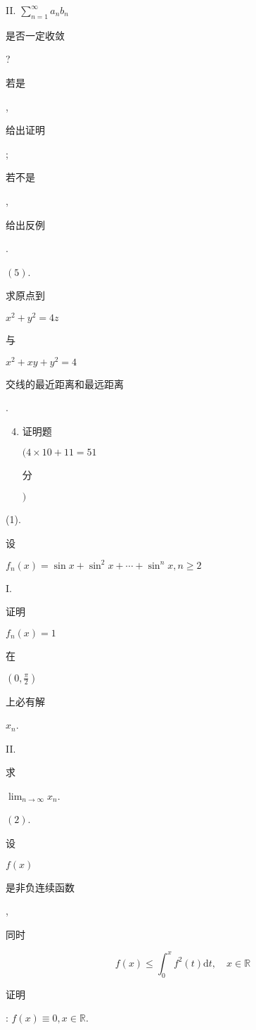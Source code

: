 \documentclass[10pt]{article}
\begin{document}
II. $\sum_{n=1}^{\infty} a_{n} b_{n}$ \begin{CJK}{UTF8}{mj}是否一定收敛\end{CJK}? \begin{CJK}{UTF8}{mj}若是\end{CJK}, \begin{CJK}{UTF8}{mj}给出证明\end{CJK}; \begin{CJK}{UTF8}{mj}若不是\end{CJK}, \begin{CJK}{UTF8}{mj}给出反例\end{CJK}.

$(5)$. \begin{CJK}{UTF8}{mj}求原点到\end{CJK} $x^{2}+y^{2}=4 z$ \begin{CJK}{UTF8}{mj}与\end{CJK} $x^{2}+x y+y^{2}=4$ \begin{CJK}{UTF8}{mj}交线的最近距离和最远距离\end{CJK}.

\begin{enumerate}
  \setcounter{enumi}{3}
  \item \begin{CJK}{UTF8}{mj}证明题\end{CJK} $(4 \times 10+11=51$ \begin{CJK}{UTF8}{mj}分\end{CJK} $)$
\end{enumerate}
(1). \begin{CJK}{UTF8}{mj}设\end{CJK} $f_{n}(x)=\sin x+\sin ^{2} x+\cdots+\sin ^{n} x, n \geqslant 2$

I. \begin{CJK}{UTF8}{mj}证明\end{CJK} $f_{n}(x)=1$ \begin{CJK}{UTF8}{mj}在\end{CJK} $\left(0, \frac{\pi}{2}\right)$ \begin{CJK}{UTF8}{mj}上必有解\end{CJK} $x_{n}$.

II. \begin{CJK}{UTF8}{mj}求\end{CJK} $\lim _{n \rightarrow \infty} x_{n}$.

$(2)$. \begin{CJK}{UTF8}{mj}设\end{CJK} $f(x)$ \begin{CJK}{UTF8}{mj}是非负连续函数\end{CJK}, \begin{CJK}{UTF8}{mj}同时\end{CJK}
$$
f(x) \leqslant \int_{0}^{x} f^{2}(t) \mathrm{d} t, \quad x \in \mathbb{R}
$$
\begin{CJK}{UTF8}{mj}证明\end{CJK}: $f(x) \equiv 0, x \in \mathbb{R}$.
\end{document}
